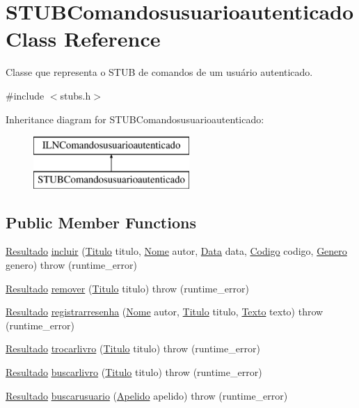 \hypertarget{classSTUBComandosusuarioautenticado}{}\section{S\+T\+U\+B\+Comandosusuarioautenticado Class Reference}
\label{classSTUBComandosusuarioautenticado}


Classe que representa o S\+T\+UB de comandos de um usuário autenticado.  




{\ttfamily \#include $<$stubs.\+h$>$}

Inheritance diagram for S\+T\+U\+B\+Comandosusuarioautenticado\+:\begin{figure}[H]
\begin{center}
\leavevmode
\includegraphics[height=2.000000cm]{classSTUBComandosusuarioautenticado}
\end{center}
\end{figure}
\subsection*{Public Member Functions}
\begin{DoxyCompactItemize}
\item 
\hyperlink{classResultado}{Resultado} \hyperlink{classSTUBComandosusuarioautenticado_ab51b67eeaf6f9e8c97740472eb7efc64}{incluir} (\hyperlink{classTitulo}{Titulo} titulo, \hyperlink{classNome}{Nome} autor, \hyperlink{classData}{Data} data, \hyperlink{classCodigo}{Codigo} codigo, \hyperlink{classGenero}{Genero} genero)  throw (runtime\+\_\+error)
\item 
\hyperlink{classResultado}{Resultado} \hyperlink{classSTUBComandosusuarioautenticado_ade03e70408581ca1185da788b862f66c}{remover} (\hyperlink{classTitulo}{Titulo} titulo)  throw (runtime\+\_\+error)
\item 
\hyperlink{classResultado}{Resultado} \hyperlink{classSTUBComandosusuarioautenticado_a4bac787ff5d5361dd74b6025820f02f5}{registrarresenha} (\hyperlink{classNome}{Nome} autor, \hyperlink{classTitulo}{Titulo} titulo, \hyperlink{classTexto}{Texto} texto)  throw (runtime\+\_\+error)
\item 
\hyperlink{classResultado}{Resultado} \hyperlink{classSTUBComandosusuarioautenticado_a21a724886a8e5ff41cb44557a8904f74}{trocarlivro} (\hyperlink{classTitulo}{Titulo} titulo)  throw (runtime\+\_\+error)
\item 
\hyperlink{classResultado}{Resultado} \hyperlink{classSTUBComandosusuarioautenticado_a2befe1be25e27594d0eec3c767c3a145}{buscarlivro} (\hyperlink{classTitulo}{Titulo} titulo)  throw (runtime\+\_\+error)
\item 
\hyperlink{classResultado}{Resultado} \hyperlink{classSTUBComandosusuarioautenticado_ab8b5ce430c1c47e95e1e7be8f7b26dda}{buscarusuario} (\hyperlink{classApelido}{Apelido} apelido)  throw (runtime\+\_\+error)
\end{DoxyCompactItemize}
